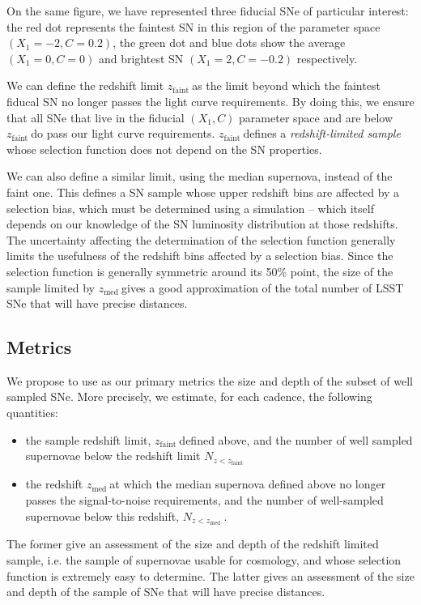 \documentclass [11pt,a4paper]{article}
\newcommand{\zfaint}{$z_{\mathrm{faint}}\ $}
\newcommand{\nsnfaint}{$N_{z<z_{\mathrm{faint}}}\ $}
\newcommand{\zmed}{$z_{\mathrm{med}}\ $}
\newcommand{\nsnmed}{$N_{z<z_{\mathrm{med}}}\ $}
\begin{document}
On the same figure, we have represented three fiducial SNe of
particular interest: the red dot represents the faintest SN in this
region of the parameter space $(X_1=-2, C=0.2)$, the green dot and
blue dots show the average $(X_1=0, C=0)$ and brightest SN $(X_1=2,
C=-0.2)$ respectively.

We can define the redshift limit \zfaint as the limit beyond which the
faintest fiducal SN no longer passes the light curve requirements. By
doing this, we ensure that all SNe that live in the fiducial $(X_1,C)$
parameter space and are below \zfaint do pass our light curve
requirements.  \zfaint defines a {\em redshift-limited sample} whose
selection function does not depend on the SN properties.

We can also define a similar limit, using the median supernova,
instead of the faint one.  This defines a SN sample whose upper
redshift bins are affected by a selection bias, which must be
determined using a simulation -- which itself depends on our knowledge
of the SN luminosity distribution at those redshifts.  The uncertainty
affecting the determination of the selection function generally limits
the usefulness of the redshift bins affected by a selection bias.
Since the selection function is generally symmetric around its 50\%
point, the size of the sample limited by \zmed gives a good
approximation of the total number of LSST SNe that will have precise
distances.


\subsection{Metrics}
\label{sec:metrics}
We propose to use as our primary metrics the size and depth of the
subset of well sampled SNe.  More precisely, we estimate, for each
cadence, the following quantities:

\begin{itemize}
\item the sample redshift limit, \zfaint defined above, and the number
  of well sampled supernovae below the redshift limit \nsnfaint
\item the redshift \zmed at which the median supernova defined above
  no longer passes the signal-to-noise requirements, and the number of
  well-sampled supernovae below this redshift, \nsnmed.  
\end{itemize}
The former give an assessment of the size and depth of the redshift
limited sample, i.e. the sample of supernovae usable for cosmology,
and whose selection function is extremely easy to determine.  The
latter gives an assessment of the size and depth of the sample of SNe
that will have precise distances.
\end{document}
